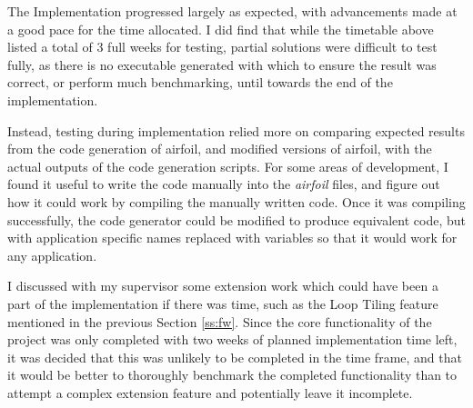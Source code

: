 The Implementation progressed largely as expected, with advancements made at a good pace for the time allocated. I did find that while the timetable above listed a total of 3 full weeks for testing, partial solutions were difficult to test fully, as there is no executable generated with which to ensure the result was correct, or perform much benchmarking, until towards the end of the implementation.
\par
Instead, testing during implementation relied more on comparing expected results from the code generation of airfoil, and modified versions of airfoil, with the actual outputs of the code generation scripts. For some areas of development, I found it useful to write the code manually into the \textit{airfoil} files, and figure out how it could work by compiling the manually written code. Once it was compiling successfully, the code generator could be modified to produce equivalent code, but with application specific names replaced with variables so that it would work for any application.
\par
I discussed with my supervisor some extension work which could have been a part of the implementation if there was time, such as the Loop Tiling feature mentioned in the previous Section \ref{ss:fw}. Since the core functionality of the project was only completed with two weeks of planned implementation time left, it was decided that this was unlikely to be completed in the time frame, and that it would be better to thoroughly benchmark the completed functionality than to attempt a complex extension feature and potentially leave it incomplete.

